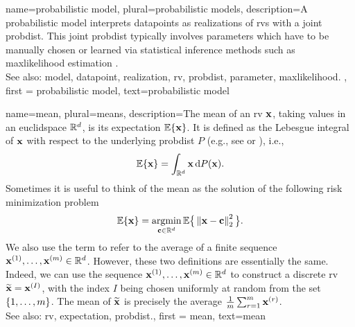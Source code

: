 {
	name={probabilistic model}, plural={probabilistic models},
	description={A probabilistic \gls{model} interprets \glspl{datapoint} 
		as \glspl{realization} of \glspl{rv} with a joint \gls{probdist}. This joint \gls{probdist} typically 
		involves \glspl{parameter} which have to be manually chosen or learned via statistical inference 
		methods such as \gls{maxlikelihood} estimation \cite{LC}.
					\\ 
		See also: \gls{model}, \gls{datapoint}, \gls{realization}, \gls{rv}, \gls{probdist}, \gls{parameter}, \gls{maxlikelihood}. }, 
	first = {probabilistic model}, text={probabilistic model} 
}



{name={mean}, plural={means},
 description={The  mean of an \gls{rv} ${\bf x}$, taking 
 	values in an \gls{euclidspace} $\mathbb{R}^{d}$, is its 
 	\gls{expectation} $\mathbb{E}\{{\bf x}\}$. It is defined as the Lebesgue 
 	integral of ${\bf x}$ with respect to the underlying \gls{probdist} $P$ (e.g., see \cite{RudinBookPrinciplesMatheAnalysis} or \cite{BillingsleyProbMeasure}), i.e.,
	\[
		\mathbb{E}\{{\bf x}\} = \int_{\mathbb{R}^{d}} {\bf x} \, \mathrm{d}P({\bf x}).
	\] 
	Sometimes it is useful to think of the mean as the solution of the following \gls{risk} 
	minimization problem \cite{BertsekasProb}
	\[
		\mathbb{E}\{{\bf x}\} = \operatorname*{argmin}_{{\bf c} \in \mathbb{R}^{d}} 
		\mathbb{E} \big\{\left\Vert {{\bf x}- {\bf c}} \right\Vert_{2}^{2}\big \}.
	\] 
	We also use the term to refer to the average of a finite sequence 
	${\bf x}^{(1)}, \ldots, {\bf x}^{(m)} \in \mathbb{R}^{d}$. However, 
	these two definitions are essentially the same. Indeed, we can use the sequence 
	${\bf x}^{(1)}, \ldots, {\bf x}^{(m)} \in \mathbb{R}^{d}$ to construct a 
	discrete \gls{rv} $\widetilde{{\bf x}}={\bf x}^{(I)}$, with the index $I$ being chosen uniformly 
	at random from the set $\{1,\ldots,m\}$. The mean of $\widetilde{{\bf x}}$ is 
	precisely the average $\frac{1}{m} \sum_{r=1}^{m} {\bf x}^{(r)}$.
			\\ 
		See also: \gls{rv}, \gls{expectation}, \gls{probdist}.}, 
		first = {mean}, text={mean} 
}

